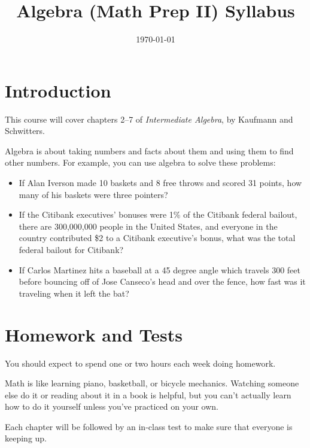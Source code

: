 \documentclass[letterpaper, landscape]{exam}
\title{Algebra (Math Prep II) Syllabus}
\date{\today}
\begin{document}
    \maketitle

    \section{Introduction}
    This course will cover chapters 2--7 of {\em Intermediate Algebra}, by Kaufmann and Schwitters.  

    Algebra is about taking numbers and facts about them and using them to find other numbers.  For
    example, you can use algebra to solve these problems:

    \begin{itemize}
        \item If Alan Iverson made 10 baskets and 8 free throws and scored 31 points, how many of
            his baskets were three pointers?

        \item If the Citibank executives' bonuses were 1\% of the Citibank federal bailout, there
            are 300,000,000 people in the United States, and everyone in the country contributed \$2
            to a Citibank executive's bonus, what was the total federal bailout for Citibank?

        \item If Carlos Martinez hits a baseball at a 45 degree angle which travels 300 feet before
            bouncing off of Jose Canseco's head and over the fence, how fast was it traveling when
            it left the bat?

    \end{itemize}

    \newpage

    \section{Homework and Tests}

    You should expect to spend one or two hours each week doing homework.

    Math is like learning piano, basketball, or bicycle mechanics.  Watching someone else do it or
    reading about it in a book is helpful, but you can't actually learn how to do it yourself
    unless you've practiced on your own.

    Each chapter will be followed by an in-class test to make sure that everyone is keeping up.
\end{document}
